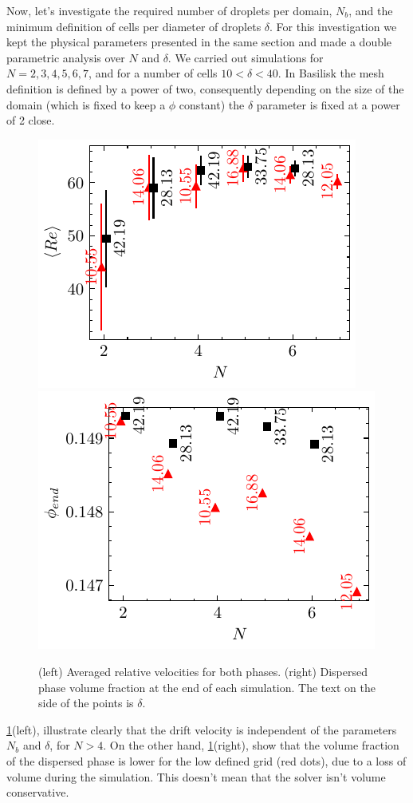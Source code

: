 Now, let's investigate the required number of droplets per domain, $N_b$, and the minimum definition of cells per diameter of droplets $\delta$.  
For this investigation we kept the physical parameters presented in the same section and made a double parametric analysis over $N$ and $\delta$. 
We carried out simulations for $N = 2, 3, 4, 5, 6, 7$, and for a number of cells $10 <\delta < 40$. 
In Basilisk the mesh definition is defined by a power of two, consequently depending on the size of the domain (which is fixed to keep a $\phi$ constant) the $\delta$ parameter is fixed at a power of 2 close. 
\begin{figure}[h!]
    \centering
    \includegraphics[height= 0.3\textwidth]{image/VALIDATION/N_and_delta/DUd.pdf}
    \includegraphics[height= 0.3\textwidth]{image/VALIDATION/N_and_delta/PHI.pdf}
    \caption{(left) Averaged relative velocities for both phases.
            (right) Dispersed phase volume fraction at the end of each simulation.
            The text on the side of the points is $\delta$. }
    \label{fig:VALIDATION_Nd_1}
\end{figure}
\ref{fig:VALIDATION_Nd_1}(left), illustrate clearly that the drift velocity is independent of the parameters $N_b$ and $\delta$, for $N >4$. 
On the other hand, \ref{fig:VALIDATION_Nd_1}(right), show that the volume fraction of the dispersed phase is lower for the low defined grid (red dots), due to a loss of volume during the simulation.
This doesn't mean that the solver isn't volume conservative. 
